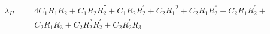 \documentclass[a4paper]{article}
\begin{document}
\begin{equation*}
\begin{split}
	\lambda_H =\ & 4 C_{1} R_{1} R_{2} + C_{1} R_{2} R_{2}^{''} + C_{1} R_{2} R_{2}^{'} + C_{2} {R_{1}}^{2} + C_{2} R_{1} R_{2}^{''} + C_{2} R_{1} R_{2}^{'} +\\ &
	C_{2} R_{1} R_{3} + C_{2} R_{2}^{''} R_{2}^{'} + C_{2} R_{2}^{'} R_{3}
\end{split}
\end{equation*}

%
%
%
%
%
\end{document}
